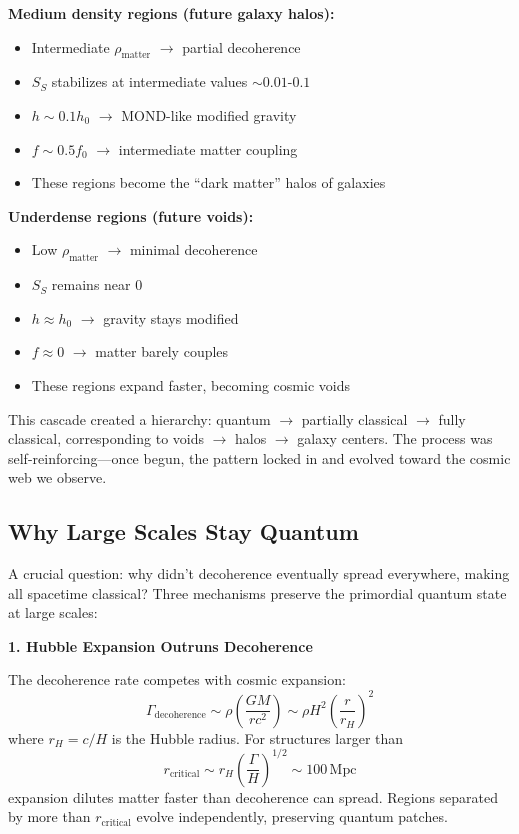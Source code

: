 \documentclass[12pt]{article}
\begin{document}
\textbf{Medium density regions (future galaxy halos):}
\begin{itemize}
    \item Intermediate $\rho_\mathrm{matter}$ $\rightarrow$ partial decoherence
    \item $S_S$ stabilizes at intermediate values $\sim 0.01$-$0.1$
    \item $h \sim 0.1 h_0$ $\rightarrow$ MOND-like modified gravity
    \item $f \sim 0.5 f_0$ $\rightarrow$ intermediate matter coupling
    \item These regions become the ``dark matter'' halos of galaxies
\end{itemize}

\textbf{Underdense regions (future voids):}
\begin{itemize}
    \item Low $\rho_\mathrm{matter}$ $\rightarrow$ minimal decoherence
    \item $S_S$ remains near $0$
    \item $h \approx h_0$ $\rightarrow$ gravity stays modified
    \item $f \approx 0$ $\rightarrow$ matter barely couples
    \item These regions expand faster, becoming cosmic voids
\end{itemize}

This cascade created a hierarchy: quantum $\rightarrow$ partially classical $\rightarrow$ fully classical, corresponding to voids $\rightarrow$ halos $\rightarrow$ galaxy centers. The process was self-reinforcing---once begun, the pattern locked in and evolved toward the cosmic web we observe.

\subsection{Why Large Scales Stay Quantum}

A crucial question: why didn't decoherence eventually spread everywhere, making all spacetime classical? Three mechanisms preserve the primordial quantum state at large scales:

\textbf{1. Hubble Expansion Outruns Decoherence}

The decoherence rate competes with cosmic expansion:
\begin{equation}
    \Gamma_\mathrm{decoherence} \sim \rho \left( \frac{GM}{rc^2} \right) \sim \rho H^2 \left( \frac{r}{r_H} \right)^2
\end{equation}
where $r_H = c/H$ is the Hubble radius. For structures larger than
\begin{equation}
    r_\mathrm{critical} \sim r_H \left( \frac{\Gamma}{H} \right)^{1/2} \sim 100\,\mathrm{Mpc}
\end{equation}
expansion dilutes matter faster than decoherence can spread. Regions separated by more than $r_\mathrm{critical}$ evolve independently, preserving quantum patches.
\end{document}
